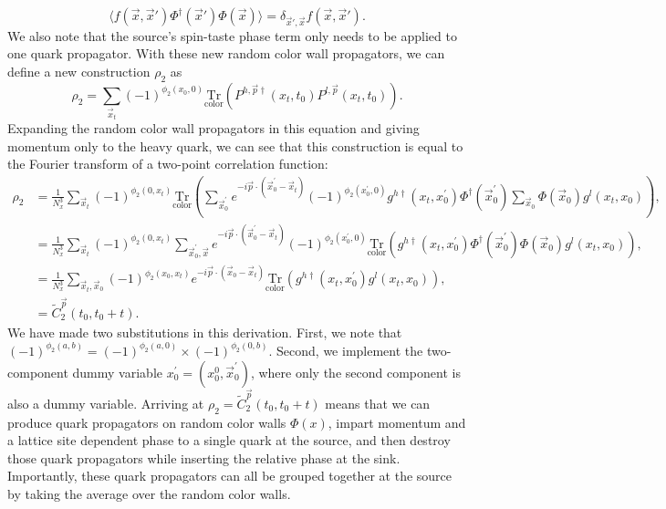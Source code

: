 \begin{equation}\label{eq:color_field_property}
   \langle f(\vec{x}, \vec{x}') \Phi^\dagger(\vec{x}') \Phi(\vec{x})\rangle =
   \delta_{\vec{x}', \vec{x}} f(\vec{x}, \vec{x}').
\end{equation}
We also note that the source's spin-taste phase term only needs to be applied to one quark propagator.  With these new random color wall propagators, we can define a new construction $\rho_2$ as
\begin{equation}\label{eq:rho_def}
    \rho_2 = \sum_{\vec{x}_t}(-1)^{\phi_2(x_0,0)}\mathrm{\underset{color}{Tr}}\left(P^{h,\vec{p}\dagger}(x_t,t_0)P^{l,\vec{p}}(x_t,t_0)\right).
\end{equation}
Expanding the random color wall propagators in this equation and giving momentum only to the heavy quark, we can see that this construction is equal to the Fourier transform of a two-point correlation function:
\begin{equation}\label{eq:rho_derive}
\begin{split}
 \rho_2 &= \frac{1}{N^3_x}\sum_{\vec{x}_t}(-1)^{\phi_2(0,x_t)}\mathrm{\underset{color}{Tr}}\left( 
 \sum_{\vec{x}^{\prime}_0} e^{-i\vec{p}\cdot(\vec{x}^{\prime}_0-\vec{x}_t)} (-1)^{\phi_2(x^{\prime}_0,0)} g^{h\dagger}(x_t,x^{\prime}_0) \Phi^\dagger(\vec{x}^{\prime}_0)
 \sum_{\vec{x}_0} \Phi(\vec{x}_0)g^l(x_t,x_0)
 \right),\\
 &= \frac{1}{N^3_x}\sum_{\vec{x}_t}(-1)^{\phi_2(0,x_t)}\sum_{\vec{x}^{\prime}_0, \vec{x}} e^{-i\vec{p}\cdot(\vec{x}^{\prime}_0-\vec{x}_t)} (-1)^{\phi_2(x^{\prime}_0,0)} \mathrm{\underset{color}{Tr}}\left(g^{h\dagger}(x_t,x^{\prime}_0) \Phi^\dagger(\vec{x}^{\prime}_0) \Phi(\vec{x}_0)g^l(x_t,x_0) \right),\\
 &= \frac{1}{N^3_x}\sum_{\vec{x}_t,\vec{x}_0}(-1)^{\phi_2(x_0,x_t)}e^{-i\vec{p}\cdot(\vec{x}_0-\vec{x}_t)}\mathrm{{\underset{color}{Tr}}}\left(g^{h\dagger}(x_t,x^{\prime}_0)g^l(x_t,x_0) \right),\\
 &= \tilde{C}_2^{\vec{p}}(t_0, t_0+t).
\end{split}
\end{equation}
We have made two substitutions in this derivation.  First, we note that $(-1)^{\phi_2(a,b)}=(-1)^{\phi_2(a,0)}\times(-1)^{\phi_2(0,b)}$. Second, we implement the two-component dummy variable $x^\prime_0=(x_0^0, \vec{x}^\prime_0)$, where only the second component is also a dummy variable.  Arriving at $\rho_2 = \tilde{C}_2^{\vec{p}}(t_0, t_0+t)$ means that we can produce quark propagators on random color walls $\Phi(x)$, impart momentum and a lattice site dependent phase to a single quark at the source, and then destroy those quark propagators while inserting the relative phase at the sink.  Importantly, these quark propagators can all be grouped together at the source by taking the average over the random color walls.  

